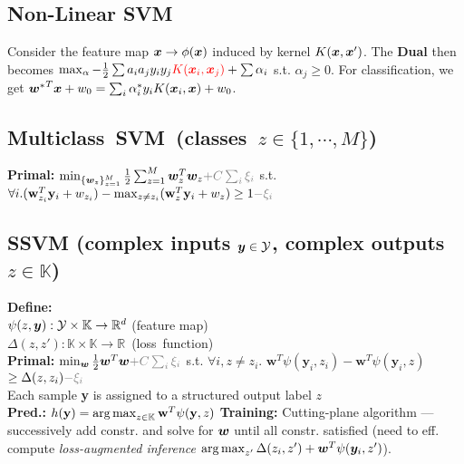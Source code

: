 \subsection*{Non-Linear SVM}
Consider the feature map ${\bm{x}} \rightarrow \phi({\bm{x}})$ induced by kernel $K({\bm{x}}, {\bm{x}}')$. The \textbf{Dual} then becomes $\max_\alpha -\frac{1}{2}\sum a_ia_jy_iy_j{\color{red}K({\bm{x}}_i, {\bm{x}}_j)} + \sum\alpha_i$ s.t.
$\alpha_j\geq 0$. For classification, we get ${{\bm{w}}^*}^T{\bm{x}} + w_0 = \sum_i \alpha_i^*y_iK({\bm{x}}_i, {\bm{x}}) + w_0$.

\subsection*{\mbox{Multiclass SVM (classes $z\in\{1,\cdots,M\}$)}}
\textbf{Primal:} $\min_{\{\vw_z\}_{z=1}^M} \frac{1}{2}\sum_{z=1}^M \vw^T_z\vw_z {\color{gray} + C\sum_i \xi_i}$ s.t.
$\forall i. (\mathbf{w}_{z_i}^T\mathbf{y}_i+w_{z_i})-\max_{z\not=z_i}(\mathbf{w}_z^T\mathbf{y}_i+w_{z})\geq 1{\color{gray}-\xi_i}$

\subsection*{SSVM (complex inputs ${\bm{y}}\in\mathcal{Y}$, complex outputs $z\in\mathbb{K}$)}
\textbf{Define:}\\$\psi(z,{\bm{y}}):\mathcal{Y}\times\mathbb{K}\to \mathbb{R}^d$ (feature map)\\
\mbox{$\Delta(z,z'):\mathbb{K}\times\mathbb{K}\to \mathbb{R}$ (loss function)}\\
\textbf{Primal:}
$\min_\vw \frac{1}{2}\vw^T\vw {\color{gray} + C\sum_i \xi_i}$ s.t.
\mbox{$\forall i,z\neq z_i.\,\,\mathbf{w}^T\psi(\mathbf{y}_i,z_i)-\mathbf{w}^T\psi(\mathbf{y}_i,z)$}\\$\geq \Delta(z, z_i){\color{gray}-\xi_i}$\\
Each sample \textbf{y} is assigned to a structured output label $z$\\
\textbf{Pred.:} \mbox{$h(\mathbf{y}) = \operatorname*{arg\,max}_{z\in\mathbb{K}} \mathbf{w}^T\psi(\mathbf{y},z)$}
\textbf{Training:} Cutting-plane algorithm --- successively add constr. and solve for ${\bm{w}}$ until all constr. satisfied (need to eff. compute \emph{loss-augmented inference} $\operatorname*{arg\,max}_{z'}\Delta(z_i, z') + {\bm{w}}^T\psi({\bm{y}}_i, z')$).


